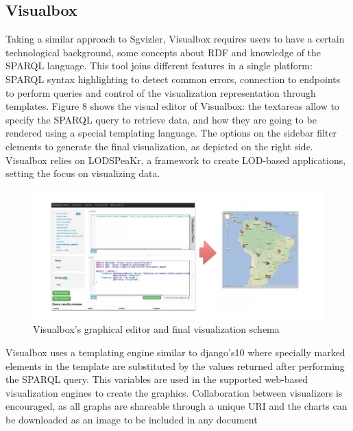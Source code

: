 \documentclass[a4paper,12pt,oneside]{report}
\begin{document}
{{{\subsection{Visualbox}
{Taking a similar approach to Sgvizler, Visualbox  requires users to have a certain technological background, some concepts about RDF and knowledge of the SPARQL language. This tool joins different features in a single platform: SPARQL syntax highlighting to detect common errors, connection to endpoints to perform queries and control of the visualization representation through templates. Figure 8 shows the visual editor of Visualbox: the textareas allow to specify the SPARQL query to retrieve data, and how they are going to be rendered using a special templating language. The options on the sidebar filter elements to generate the final visualization, as depicted on the right side. Visualbox relies on LODSPeaKr, a framework to create LOD-based applications, setting the focus on visualizing data.
\begin{figure}[h!]
\centering
\includegraphics[width=1\textwidth]{Capture16}
\caption{Visualbox’s graphical editor and final visualization schema}
\end{figure}
Visualbox uses a templating engine similar to django’s10 where specially marked elements in the template are substituted by the values returned after performing the SPARQL query. This variables are used in the supported web-based visualization engines to create the
graphics. Collaboration between visualizers is encouraged, as all graphs are shareable through a unique URI and the charts can be downloaded as an image to be included in any document
}
}}}
\end{document}
